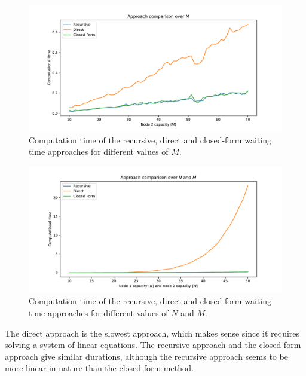\begin{figure}[H]
    \includegraphics[width=\textwidth]{chapters/03_queueing_model/img/numeric_results_and_timings/waiting_time_formulas_comparison/algorithm_duration_over_M.pdf}
    \caption{Computation time of the recursive, direct and closed-form waiting
    time approaches for different values of \(M\).}
    \label{fig:waiting_time_algorithm_duration_over_M}
\end{figure}


\begin{figure}[H]
    \includegraphics[width=\textwidth]{chapters/03_queueing_model/img/numeric_results_and_timings/waiting_time_formulas_comparison/algorithm_duration_over_N_and_M.pdf}
    \caption{Computation time of the recursive, direct and closed-form waiting
    time approaches for different values of \(N\) and \(M\).}
    \label{fig:waiting_time_algorithm_duration_over_N_and_M}
\end{figure}

The direct approach is the slowest approach, which makes sense since it requires
solving a system of linear equations.
The recursive approach and the closed form approach give similar durations,
although the recursive approach seems to be more linear in nature than the
closed form method.


